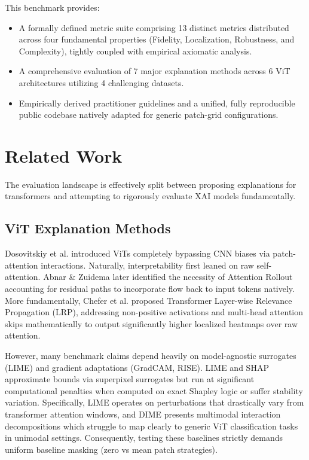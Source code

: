 \documentclass[10pt,journal,compsoc]{IEEEtran}
\begin{document}
This benchmark provides:
\begin{itemize}
    \item A formally defined metric suite comprising 13 distinct metrics distributed across four fundamental properties (Fidelity, Localization, Robustness, and Complexity), tightly coupled with empirical axiomatic analysis.
    \item A comprehensive evaluation of 7 major explanation methods across 6 ViT architectures utilizing 4 challenging datasets.
    \item Empirically derived practitioner guidelines and a unified, fully reproducible public codebase natively adapted for generic patch-grid configurations.
\end{itemize}

\section{Related Work}
\label{sec:related_work}

The evaluation landscape is effectively split between proposing explanations for transformers and attempting to rigorously evaluate XAI models fundamentally.

\subsection{ViT Explanation Methods}
Dosovitskiy et al. introduced ViTs completely bypassing CNN biases via patch-attention interactions. Naturally, interpretability first leaned on raw self-attention. Abnar \& Zuidema later identified the necessity of Attention Rollout accounting for residual paths to incorporate flow back to input tokens natively. More fundamentally, Chefer et al. proposed Transformer Layer-wise Relevance Propagation (LRP), addressing non-positive activations and multi-head attention skips mathematically to output significantly higher localized heatmaps over raw attention. 

However, many benchmark claims depend heavily on model-agnostic surrogates (LIME) and gradient adaptations (GradCAM, RISE). LIME and SHAP approximate bounds via superpixel surrogates but run at significant computational penalties when computed on exact Shapley logic or suffer stability variation. Specifically, LIME operates on perturbations that drastically vary from transformer attention windows, and DIME presents multimodal interaction decompositions which struggle to map clearly to generic ViT classification tasks in unimodal settings. Consequently, testing these baselines strictly demands uniform baseline masking (zero vs mean patch strategies).
\end{document}
